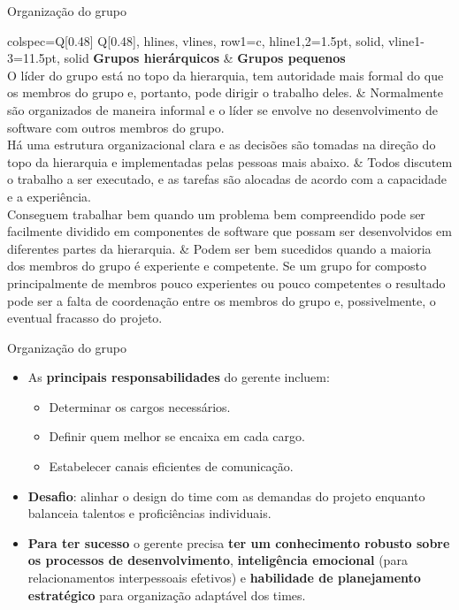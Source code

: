\documentclass{beamer}
\begin{document}
\begin{frame}{Organização do grupo}
	\begin{tblr}{colspec={Q[0.48\textwidth] Q[0.48\textwidth]}, hlines, vlines, row{1}={c}, hline{1,2}={1.5pt, solid}, vline{1-3}={1}{1.5pt, solid}}
		\textbf{Grupos hierárquicos} & \textbf{Grupos pequenos}\\
		\justifying\scriptsize O líder do grupo está no topo da hierarquia, tem autoridade mais formal do que os membros do grupo e, portanto, pode dirigir o trabalho deles. & \justifying\scriptsize Normalmente são organizados de maneira informal e o líder se envolve no desenvolvimento de software com outros membros do grupo.\\
		\justifying\scriptsize Há uma estrutura organizacional clara e as decisões são tomadas na direção do topo da hierarquia e implementadas pelas pessoas mais abaixo. & \justifying\scriptsize Todos discutem o trabalho a ser executado, e as tarefas são alocadas de acordo com a capacidade e a experiência.\\
		\justifying\scriptsize Conseguem trabalhar bem quando um problema bem compreendido pode ser facilmente dividido em componentes de software que possam ser desenvolvidos em diferentes partes da hierarquia. & \justifying\scriptsize Podem ser bem sucedidos quando a maioria dos membros do grupo é experiente e competente. Se um grupo for composto principalmente de membros pouco experientes ou pouco competentes o resultado pode ser a falta de coordenação entre os membros do grupo e, possivelmente, o eventual fracasso do projeto.
	\end{tblr}
\end{frame}

\begin{frame}{Organização do grupo}
	\begin{itemize}
		\justifying
		\item As \textbf{principais responsabilidades} do gerente incluem:
		\begin{itemize}
			\justifying
			\item Determinar os cargos necessários.
			\item Definir quem melhor se encaixa em cada cargo.
			\item Estabelecer canais eficientes de comunicação.
		\end{itemize}
		\item<2-> \textbf{Desafio}: alinhar o design do time com as demandas do projeto enquanto balanceia talentos e proficiências individuais.
		\item<3> \textbf{Para ter sucesso} o gerente precisa \textbf{ter um conhecimento robusto sobre os processos de desenvolvimento}, \textbf{inteligência emocional} (para relacionamentos interpessoais efetivos) e \textbf{habilidade de planejamento estratégico} para organização adaptável dos times.
	\end{itemize}
\end{frame}
\end{document}
